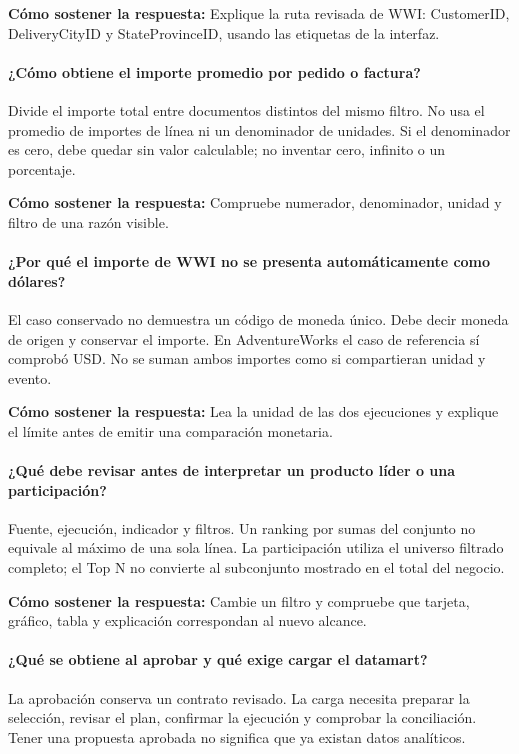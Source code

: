 \textbf{Cómo sostener la respuesta:} Explique la ruta revisada de WWI: CustomerID, DeliveryCityID y StateProvinceID, usando las etiquetas de la interfaz.

\paragraph{¿Cómo obtiene el importe promedio por pedido o factura?} Divide el importe total entre documentos distintos del mismo filtro. No usa el promedio de importes de línea ni un denominador de unidades. Si el denominador es cero, debe quedar sin valor calculable; no inventar cero, infinito o un porcentaje.

\textbf{Cómo sostener la respuesta:} Compruebe numerador, denominador, unidad y filtro de una razón visible.

\paragraph{¿Por qué el importe de WWI no se presenta automáticamente como dólares?} El caso conservado no demuestra un código de moneda único. Debe decir moneda de origen y conservar el importe. En AdventureWorks el caso de referencia sí comprobó USD. No se suman ambos importes como si compartieran unidad y evento.

\textbf{Cómo sostener la respuesta:} Lea la unidad de las dos ejecuciones y explique el límite antes de emitir una comparación monetaria.

\paragraph{¿Qué debe revisar antes de interpretar un producto líder o una participación?} Fuente, ejecución, indicador y filtros. Un ranking por sumas del conjunto no equivale al máximo de una sola línea. La participación utiliza el universo filtrado completo; el Top N no convierte al subconjunto mostrado en el total del negocio.

\textbf{Cómo sostener la respuesta:} Cambie un filtro y compruebe que tarjeta, gráfico, tabla y explicación correspondan al nuevo alcance.

\paragraph{¿Qué se obtiene al aprobar y qué exige cargar el datamart?} La aprobación conserva un contrato revisado. La carga necesita preparar la selección, revisar el plan, confirmar la ejecución y comprobar la conciliación. Tener una propuesta aprobada no significa que ya existan datos analíticos.

